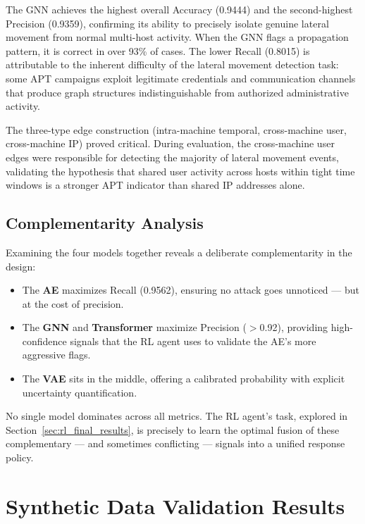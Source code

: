 The GNN achieves the highest overall Accuracy (0.9444) and the second-highest Precision (0.9359), confirming its ability to precisely isolate genuine lateral movement from normal multi-host activity. When the GNN flags a propagation pattern, it is correct in over 93\% of cases. The lower Recall (0.8015) is attributable to the inherent difficulty of the lateral movement detection task: some APT campaigns exploit legitimate credentials and communication channels that produce graph structures indistinguishable from authorized administrative activity.

The three-type edge construction (intra-machine temporal, cross-machine user, cross-machine IP) proved critical. During evaluation, the cross-machine user edges were responsible for detecting the majority of lateral movement events, validating the hypothesis that shared user activity across hosts within tight time windows is a stronger APT indicator than shared IP addresses alone.

\subsection{Complementarity Analysis}

Examining the four models together reveals a deliberate complementarity in the design:

\begin{itemize}
    \item The \textbf{AE} maximizes Recall (0.9562), ensuring no attack goes unnoticed --- but at the cost of precision.
    \item The \textbf{GNN} and \textbf{Transformer} maximize Precision ($>$0.92), providing high-confidence signals that the RL agent uses to validate the AE's more aggressive flags.
    \item The \textbf{VAE} sits in the middle, offering a calibrated probability with explicit uncertainty quantification.
\end{itemize}

No single model dominates across all metrics. The RL agent's task, explored in Section~\ref{sec:rl_final_results}, is precisely to learn the optimal fusion of these complementary --- and sometimes conflicting --- signals into a unified response policy.
\section{Synthetic Data Validation Results}
\label{sec:synthetic_validation}

